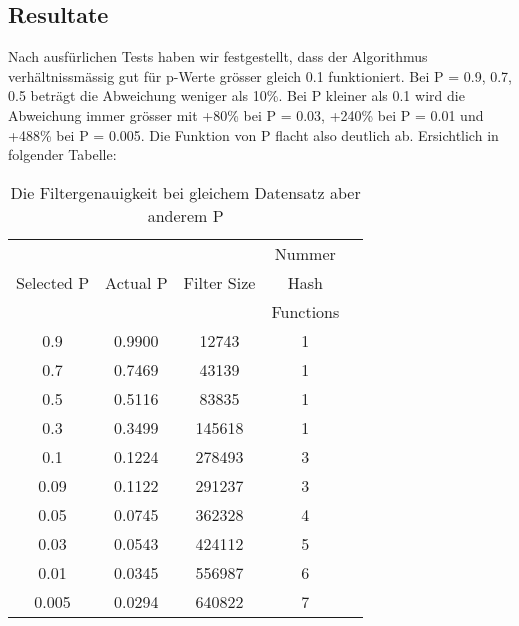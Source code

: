 \documentclass[11pt]{article}
\begin{document}
    \subsection{Resultate}
    Nach ausf{\"u}rlichen Tests haben wir festgestellt, dass der Algorithmus verh{\"a}ltnissm{\"a}ssig  gut f{\"u}r p-Werte gr{\"o}sser gleich 0.1 funktioniert.
    \newline
    Bei P = 0.9, 0.7, 0.5 betr{\"a}gt die Abweichung weniger als 10\%.
    \newline
    Bei P kleiner als 0.1 wird die Abweichung immer gr{\"o}sser mit +80\% bei P = 0.03, +240\% bei P = 0.01 und +488\% bei P = 0.005.
    \newline
    Die Funktion von P flacht also deutlich ab.
    \medskip
    \newline
    Ersichtlich in folgender Tabelle:
    \newline
    \medskip
    \begin{table}[htp]
        \label{tab:summary}
        \begin{center}
            \begin{tabular}{ccccc}
                \hline
                &                 &             &Nummer     \\
                Selected P  & Actual P        & Filter Size &Hash       \\
                &                 &             &Functions	\\
                \hline

                0.9         & 0.9900          &  12743       & 1  	\\
                0.7         & 0.7469          &  43139       & 1  	\\
                0.5         & 0.5116          &  83835       & 1  	\\
                0.3         & 0.3499          &  145618      & 1  	\\
                0.1         & 0.1224          &  278493      & 3  	\\
                0.09        & 0.1122          &  291237      & 3  	\\
                0.05        & 0.0745          &  362328      & 4    \\
                0.03        & 0.0543          &  424112      & 5  	\\
                0.01        & 0.0345          &  556987      & 6  	\\
                0.005       & 0.0294          &  640822      & 7  	\\
                \hline
            \end{tabular}
        \end{center}
        \caption{Die Filtergenauigkeit bei gleichem Datensatz aber anderem P}
    \end{table}
\end{document}
